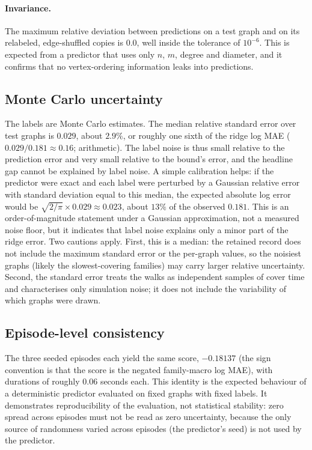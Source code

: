 \documentclass{article}
\begin{document}
\paragraph{Invariance.} The maximum relative deviation between predictions on a test graph and on its relabeled, edge-shuffled copies is $0.0$, %
well inside the tolerance of $10^{-6}$. This is expected from a predictor that uses only $n$, $m$, degree and diameter, and it confirms that no vertex-ordering information leaks into predictions.

\subsection{Monte Carlo uncertainty}
The labels are Monte Carlo estimates. The median relative standard error over test graphs is $0.029$, %
about $2.9\%$, or roughly one sixth of the ridge log MAE ($0.029/0.181\approx0.16$; arithmetic). The label noise is thus small relative to the prediction error and very small relative to the bound's error, and the headline gap cannot be explained by label noise. A simple calibration helps: if the predictor were exact and each label were perturbed by a Gaussian relative error with standard deviation equal to this median, the expected absolute log error would be $\sqrt{2/\pi}\times0.029\approx0.023$, about $13\%$ of the observed $0.181$. %
This is an order-of-magnitude statement under a Gaussian approximation, not a measured noise floor, but it indicates that label noise explains only a minor part of the ridge error. Two cautions apply. First, this is a median: the retained record does not include the maximum standard error or the per-graph values, so the noisiest graphs (likely the slowest-covering families) may carry larger relative uncertainty. Second, the standard error treats the walks as independent samples of cover time and characterises only simulation noise; it does not include the variability of which graphs were drawn.

\subsection{Episode-level consistency}
The three seeded episodes each yield the same score, $-0.18137$ (the sign convention is that the score is the negated family-macro log MAE), with durations of roughly $0.06$ seconds each. %
This identity is the expected behaviour of a deterministic predictor evaluated on fixed graphs with fixed labels. It demonstrates reproducibility of the evaluation, not statistical stability: zero spread across episodes must not be read as zero uncertainty, because the only source of randomness varied across episodes (the predictor's seed) is not used by the predictor.
\end{document}

